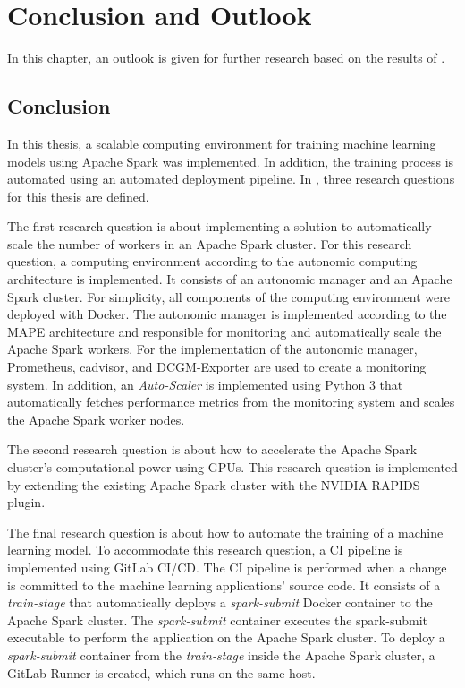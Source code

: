\chapter{Conclusion and Outlook}
\label{chap:08_outlook}

In this chapter, an outlook is given for further research based on the results of .


\section{Conclusion}
In this thesis, a scalable computing environment for training machine learning models using Apache Spark was implemented. In addition, the training process is automated using an automated deployment pipeline.
In , three research questions for this thesis are defined.


The first research question is about implementing a solution to automatically scale the number of workers in an Apache Spark cluster.
For this research question, a computing environment according to the autonomic computing architecture is implemented.
It consists of an autonomic manager and an Apache Spark cluster.
For simplicity, all components of the computing environment were deployed with Docker.
The autonomic manager is implemented according to the MAPE architecture and responsible for monitoring and automatically scale the Apache Spark workers.
For the implementation of the autonomic manager, Prometheus, cadvisor, and DCGM-Exporter are used to create a monitoring system.
In addition, an \textit{Auto-Scaler} is implemented using Python 3 that automatically fetches performance metrics from the monitoring system and scales the Apache Spark worker nodes.


The second research question is about how to accelerate the Apache Spark cluster's computational power using GPUs.
This research question is implemented by extending the existing Apache Spark cluster with the NVIDIA RAPIDS plugin.


The final research question is about how to automate the training of a machine learning model.
%
To accommodate this research question, a CI pipeline is implemented using GitLab CI/CD. The CI pipeline is performed when a change is committed to the machine learning applications' source code.
It consists of a \textit{train-stage} that automatically deploys a \textit{spark-submit} Docker container to the Apache Spark cluster.
The \textit{spark-submit} container executes the spark-submit executable to perform the application on the Apache Spark cluster.
To deploy a \textit{spark-submit} container from the \textit{train-stage} inside the Apache Spark cluster, a GitLab Runner is created, which runs on the same host.


